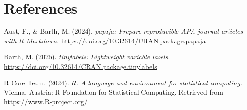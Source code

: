 \documentclass[
  doc,floatsintext]{apa6}
\newlength{\cslhangindent}
\newenvironment{CSLReferences}[2] %
 {\begin{list}{}{%
  \setlength{\itemindent}{0pt}
  \setlength{\leftmargin}{0pt}
  \setlength{\parsep}{0pt}
  \ifodd #1
   \setlength{\leftmargin}{\cslhangindent}
   \setlength{\itemindent}{-1\cslhangindent}
  \fi
  \setlength{\itemsep}{#2\baselineskip}}}
 {\end{list}}
\begin{document}
\newpage

\section{References}\label{references}

\label{refs}
\begin{CSLReferences}{1}{0}
Aust, F., \& Barth, M. (2024). \emph{{papaja}: {Prepare} reproducible {APA} journal articles with {R Markdown}}. \url{https://doi.org/10.32614/CRAN.package.papaja}

Barth, M. (2025). \emph{{tinylabels}: Lightweight variable labels}. \url{https://doi.org/10.32614/CRAN.package.tinylabels}

R Core Team. (2024). \emph{R: A language and environment for statistical computing}. Vienna, Austria: R Foundation for Statistical Computing. Retrieved from \url{https://www.R-project.org/}

\end{CSLReferences}
\end{document}
